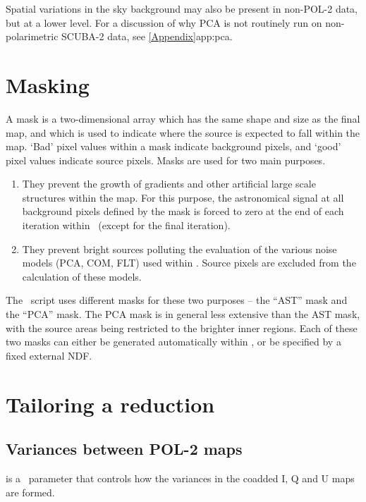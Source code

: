 Spatial variations in the sky background may also be present in non-POL-2
data, but at a lower level. For a discussion of why PCA is not routinely
run on non-polarimetric SCUBA-2 data, see \cref{Appendix}{app:pca}{}.



\section{Masking}
A mask is a two-dimensional array which has the same shape and size as
the final map, and which is used to indicate where the source is
expected to fall within the map. `Bad' pixel values within a mask
indicate background pixels, and `good' pixel values indicate source
pixels. Masks are used for two main purposes.

\begin{enumerate}
\item They prevent the growth of gradients and other artificial large
  scale structures within the map.  For this purpose, the astronomical
  signal at all background pixels defined by the mask is forced to
  zero at the end of each iteration within \makemap\ (except for the
  final iteration).
\item They prevent bright sources polluting the evaluation of the
  various noise models (PCA, COM, FLT) used within \makemap. Source
  pixels are excluded from the calculation of these models.
\end{enumerate}


The \poltwomap\ script uses different masks for these two purposes -- the
``AST'' mask and the ``PCA'' mask.  The PCA mask is in general less
extensive than the AST mask, with the source areas being restricted to
the brighter inner regions.  Each of these two masks can either be
generated automatically within , or be specified by a fixed
external NDF.



\section{Tailoring a reduction}

\subsection*{Variances between POL-2 maps}

 is a \poltwomap\ parameter that controls how the variances in the
coadded I, Q and U maps are formed.

